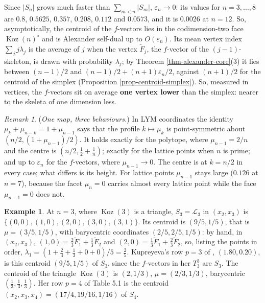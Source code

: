 \documentclass[11pt, a4paper, abstract=yes]{scrartcl}
\theoremstyle{definition}
\newtheorem{mexample}[definition]{Example}
\theoremstyle{remark}
\newtheorem{remark}[definition]{Remark}
\theoremstyle{plain}
\theoremstyle{remark}
\theoremstyle{plain}
\newcommand{\Koz}{\operatorname{Koz}}
\begin{document}
Since \(\lvert S_n\rvert\) grows much faster than \(\sum_{m<n}\lvert S_m\rvert\),
\(\varepsilon_n\to0\): its values for \(n=3,\dots,8\) are \(0.8\), \(0.5625\), \(0.357\), \(0.208\),
\(0.112\) and \(0.0573\), and it is \(0.0026\) at \(n=12\). So, asymptotically, the centroid of the
\(f\)-vectors lies in the codimension-two face \(\Koz(n)^\circ\) and is Alexander self-dual up to
\(O(\varepsilon_n)\). Its mean vertex index \(\sum_jj\lambda_j\) is the average of \(j\) when the
vertex \(\tilde F_j\), the \(f\)-vector of the \((j-1)\)-skeleton, is drawn with probability
\(\lambda_j\); by Theorem \ref{thm-alexander-core}(3) it lies between \((n-1)/2\) and
\((n-1)/2+(n+1)\varepsilon_n/2\), against
\((n+1)/2\) for the centroid of the simplex (Proposition \ref{prop-centroid-simplex}). So, measured in
vertices, the \(f\)-vectors sit on average \textbf{one vertex lower} than the simplex: nearer to the skeleta
of one dimension less.

\begin{remark}
(\emph{One map, three behaviours.}) In LYM coordinates the identity
\(\mu_k+\mu_{n-k}=1+\mu_{n-1}\) says that the profile \(k\mapsto\mu_k\) is point-symmetric about
\((n/2,(1+\mu_{n-1})/2)\). It holds exactly for the polytope, where \(\mu_{n-1}=2/n\) and the centre
is \((n/2,\tfrac12+\tfrac1n)\); exactly for the lattice points when \(n\) is prime; and up to
\(\varepsilon_n\) for the \(f\)-vectors, where \(\mu_{n-1}\to0\). The centre is at \(k=n/2\) in every
case; what differs is its height. For lattice points \(\mu_{n-1}\) stays large (\(0.126\) at \(n=7\)),
because the facet \(\mu_n=0\) carries almost every lattice point while the face \(\mu_{n-1}=0\) does
not.
\label{rem-one-map}
\end{remark}

\begin{mexample}
At \(n=3\), where \(\Koz(3)\) is a triangle, \(S_3=\mathcal L_3\) in \((x_2,x_3)\) is \(\lbrace(0,0),(1,0),(2,0),(3,0),(3,1)\rbrace\). Its
centroid is \((9/5,1/5)\), that is \(\mu=(3/5,1/5)\), with barycentric coordinates
\((2/5,2/5,1/5)\): by hand, in \((x_2,x_3)\), \((1,0)=\tfrac23\tilde F_1+\tfrac13\tilde F_2\) and
\((2,0)=\tfrac13\tilde F_1+\tfrac23\tilde F_2\), so, listing the points in order,
\(\lambda_1=(1+\tfrac23+\tfrac13+0+0)/5=\tfrac25\). Kupreyeva's row \(p=3\) of
\autocite[Table 4.2]{Kupreyeva2019}, \((1.80,0.20)\), is this centroid \((9/5,1/5)\) of \(S_3\), since the
\(f\)-vectors in her \(T^3_3\) are \(S_3\). The centroid of the triangle \(\Koz(3)\) is \((2,1/3)\), \(\mu=(2/3,1/3)\),
barycentric \((\tfrac13,\tfrac13,\tfrac13)\). Her row \(p=4\) of Table 5.1 is the centroid
\((x_2,x_3,x_4)=(17/4,19/16,1/16)\) of \(S_4\).
\label{ex-centroid-n3}
\end{mexample}
\end{document}
